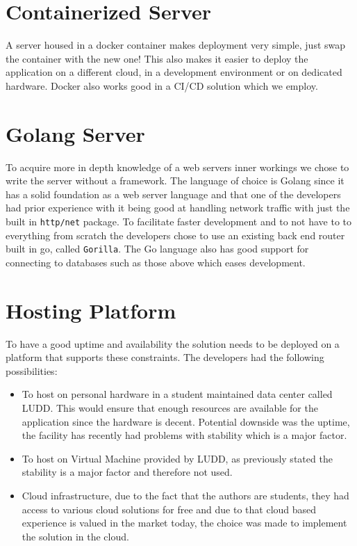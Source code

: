 \documentclass[12pt,a4paper]{report}
\begin{document}
\section{Containerized Server}
A server housed in a docker container makes deployment very simple, just swap the container with the new one! This also makes it easier to deploy the application on a different cloud, in a development environment or on dedicated hardware. Docker also works good in a CI/CD solution which we employ.

\section{Golang Server}
To acquire more in depth knowledge of a web servers inner workings we chose to write the server without a framework. The language of choice is Golang since it has a solid foundation as a web server language and that one of the developers had prior experience with it being good at handling network traffic with just the built in \texttt{http/net} package. To facilitate faster development and to not have to to everything from scratch the developers chose to use an existing back end router built in go, called \texttt{Gorilla}.
The Go language also has good support for connecting to databases such as those above which eases development. 

\section{Hosting Platform}
To have a good uptime and availability the solution needs to be deployed on a platform that supports these constraints. The developers had the following possibilities:

\begin{itemize}
    \item To host on personal hardware in a student maintained data center called LUDD. This would ensure that enough resources are available for the application since the hardware is decent. Potential downside was the uptime, the facility has recently had problems with stability which is a major factor. 
    \item To host on Virtual Machine provided by LUDD, as previously stated the stability is a major factor and therefore not used.
    \item Cloud infrastructure, due to the fact that the authors are students, they had access to various cloud solutions for free and due to that cloud based experience is valued in the market today, the choice was made to implement the solution in the cloud.
\end{itemize}
\end{document}
